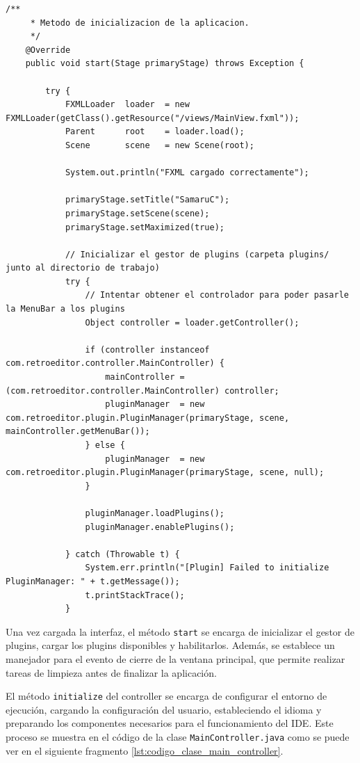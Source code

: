 \documentclass[../../main.tex]{subfiles}
\begin{document}
\begin{lstlisting}[style=mystyle, caption={Código de la clase principal MainApp.java}, label={lst:codigo_clase_main}]
    /**
     * Metodo de inicializacion de la aplicacion.
     */ 
    @Override 
    public void start(Stage primaryStage) throws Exception {

        try {
            FXMLLoader  loader  = new FXMLLoader(getClass().getResource("/views/MainView.fxml"));
            Parent      root    = loader.load();
            Scene       scene   = new Scene(root);

            System.out.println("FXML cargado correctamente");

            primaryStage.setTitle("SamaruC");
            primaryStage.setScene(scene);
            primaryStage.setMaximized(true);

            // Inicializar el gestor de plugins (carpeta plugins/ junto al directorio de trabajo)
            try {
                // Intentar obtener el controlador para poder pasarle la MenuBar a los plugins
                Object controller = loader.getController();

                if (controller instanceof com.retroeditor.controller.MainController) {
                    mainController = (com.retroeditor.controller.MainController) controller;
                    pluginManager  = new com.retroeditor.plugin.PluginManager(primaryStage, scene, mainController.getMenuBar());
                } else {
                    pluginManager  = new com.retroeditor.plugin.PluginManager(primaryStage, scene, null);
                }

                pluginManager.loadPlugins();
                pluginManager.enablePlugins();

            } catch (Throwable t) {
                System.err.println("[Plugin] Failed to initialize PluginManager: " + t.getMessage());
                t.printStackTrace();
            }

\end{lstlisting} 

Una vez cargada la interfaz, el método \lstinline|start| se encarga de inicializar el gestor de plugins, cargar los plugins disponibles y habilitarlos. Además, se establece un manejador para el evento de cierre de la ventana principal, que permite realizar tareas de limpieza antes de finalizar la aplicación.

El método \lstinline|initialize| del controller se encarga de configurar el entorno de ejecución, cargando la configuración del usuario, estableciendo el idioma y preparando los componentes necesarios para el funcionamiento del IDE. Este proceso se muestra en el código de la clase \lstinline|MainController.java| como se puede ver en el siguiente fragmento \ref{lst:codigo_clase_main_controller}.
\end{document}
